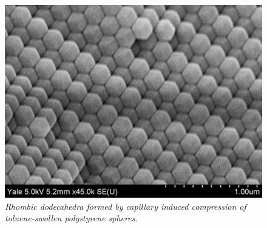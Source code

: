 \begin{figure}[htbp]
\centering
\includegraphics[width=.9\textwidth]{figures/B31_18_polygons.pdf}
\caption{\label{fig:polygons}\emph{Rhombic dodecahedra formed by capillary induced compression of toluene-swollen polystyrene spheres.}}
\end{figure}












